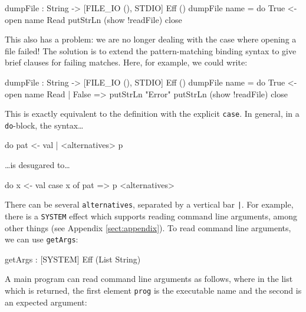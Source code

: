 \begin{code}
dumpFile : String -> { [FILE_IO (), STDIO] } Eff ()
dumpFile name = do True <- open name Read 
                   putStrLn (show !readFile)
                   close
\end{code}

\noindent
This also has a problem: we are no longer dealing with the case where
opening a file failed! The \Idris{} solution is to extend the pattern-matching
binding syntax to give brief clauses for failing matches. Here, for example,
we could write:

\begin{code}
dumpFile : String -> { [FILE_IO (), STDIO] } Eff ()
dumpFile name  = do True <- open name Read | False => putStrLn "Error"
                    putStrLn (show !readFile)
                    close
\end{code}

\noindent
This is exactly equivalent to the definition with the explicit \texttt{case}.
In general, in a \texttt{do}-block, the syntax\ldots

\begin{code}
do pat <- val | <alternatives>
   p
\end{code}

\ldots is desugared to\ldots

\begin{code}
do x <- val
   case x of
        pat => p
        <alternatives>
\end{code}

\noindent
There can be several \texttt{alternatives}, separated by a vertical bar
\texttt{|}. For example, there is a \texttt{SYSTEM} effect which supports
reading command line arguments, among other things (see Appendix
\ref{sect:appendix}). To read command
line arguments, we can use \texttt{getArgs}:

\begin{code}
getArgs : { [SYSTEM] } Eff (List String)
\end{code}

\noindent
A main program can read command line arguments as follows, where in the
list which is returned, the first element \texttt{prog} is the executable name
and the second is an expected argument:


